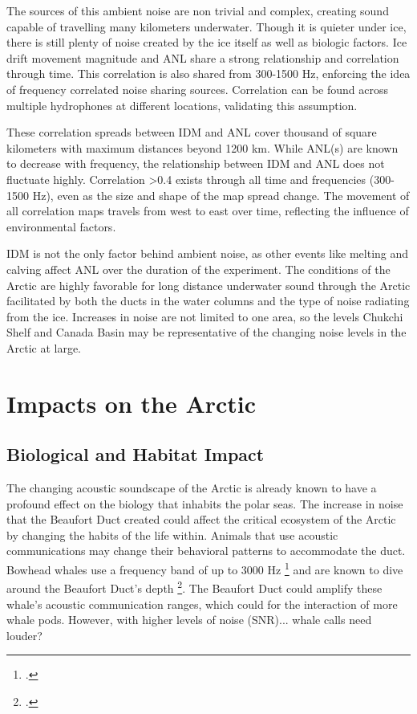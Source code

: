 The sources of this ambient noise are non trivial and complex, creating sound capable of travelling many kilometers underwater. Though it is quieter under ice, there is still plenty of noise created by the ice itself as well as biologic factors. Ice drift movement magnitude and ANL share a strong relationship and correlation through time. This correlation is also shared from 300-1500 Hz, enforcing the idea of frequency correlated noise sharing sources. Correlation can be found across multiple hydrophones at different locations, validating this assumption.

These correlation spreads between IDM and ANL cover thousand of square kilometers with maximum distances beyond 1200 km.  While ANL(s) are known to decrease with frequency, the relationship between IDM and ANL does not fluctuate highly. Correlation >0.4 exists through all time and frequencies (300-1500 Hz), even as the size and shape of the map spread change. The movement of all correlation maps travels from west to east over time, reflecting the influence of environmental factors. %

IDM is not the only factor behind ambient noise, as other events like melting and calving affect ANL over the duration of the experiment. The conditions of the Arctic are highly favorable for long distance underwater sound through the Arctic facilitated by both the ducts in the water columns and the type of noise radiating from the ice. Increases in noise are not limited to one area, so the levels Chukchi Shelf and Canada Basin may be representative of the changing noise levels in the Arctic at large. %




\section{Impacts on the Arctic}

\subsection{Biological and Habitat Impact}

The changing acoustic soundscape of the Arctic is already known to have a profound effect on the biology that inhabits the polar seas. The increase in noise that the Beaufort Duct created could affect the critical ecosystem of the Arctic by changing the habits of the life within. Animals that use acoustic communications may change their behavioral patterns to accommodate the duct. Bowhead whales use a frequency band of up to 3000 Hz \footcite[]{clark1984sounds} and are known to dive around the Beaufort Duct's depth \footcite[]{simon2009behaviour}. The Beaufort Duct could amplify these whale's acoustic communication ranges, which could for the interaction of more whale pods. However, with higher levels of noise (SNR)... whale calls need louder?%

